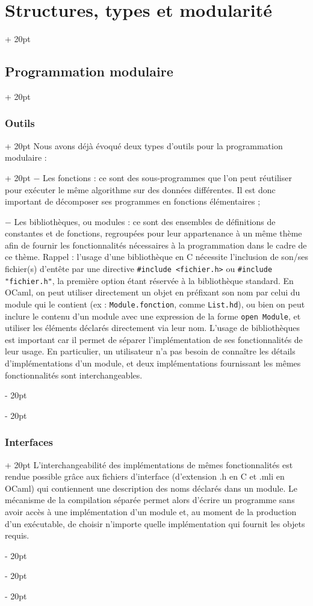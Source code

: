 \documentclass[a4paper, 12pt, twoside]{article}
\newcommand{\ind}[1][20pt]{\advance\leftskip + #1}
\newcommand{\deind}[1][20pt]{\advance\leftskip - #1}
\newenvironment{indt}[2][20pt]{#2 \par \ind[#1]}{\par \deind} %
\begin{document}
\begin{indt}{\section{Structures, types et modularité}}
\begin{indt}{\subsection{Programmation modulaire}}
\begin{indt}{\subsubsection{Outils}}
                \begin{indt}{Nous avons déjà évoqué deux types d’outils pour la programmation modulaire :}
                    $-$ Les fonctions : ce sont des sous-programmes que l’on peut réutiliser pour exécuter le même algorithme sur des données différentes. Il est donc important de décomposer ses programmes en fonctions élémentaires ;
                    
                    $-$ Les bibliothèques, ou modules : ce sont des ensembles de définitions de constantes et de fonctions, regroupées pour leur appartenance à un même thème afin de fournir les fonctionnalités nécessaires à la programmation dans le cadre de ce thème.
                    Rappel : l’usage d’une bibliothèque en C nécessite l’inclusion de son/ses fichier(s) d’entête par une directive \texttt{\#include <fichier.h>} ou \texttt{\#include "fichier.h"}, la première option étant réservée à la bibliothèque standard. En OCaml, on peut utiliser directement un objet en préfixant son nom par celui du module qui le contient (ex : \texttt{Module.fonction}, comme \texttt{List.hd}), ou bien on peut inclure le contenu d’un module avec une expression de la forme \texttt{open Module}, et utiliser les éléments déclarés directement via leur nom. L’usage de bibliothèques est important car il permet de séparer l’implémentation de ses fonctionnalités de leur usage. En particulier, un utilisateur n’a pas besoin de connaître les détails d’implémentations d’un module, et deux implémentations fournissant les mêmes fonctionnalités sont interchangeables.
                \end{indt}
                
            \end{indt}
            
            \begin{indt}{\subsubsection{Interfaces}}
                L’interchangeabilité des implémentations de mêmes fonctionnalités est rendue possible grâce aux fichiers d’interface (d’extension .h en C et .mli en OCaml) qui contiennent une description des noms déclarés dans un module. Le mécanisme de la compilation séparée permet alors d’écrire un programme sans avoir accès à une implémentation d’un module et, au moment de la production d’un exécutable, de choisir n’importe quelle implémentation qui fournit les objets requis.
                

\end{indt}
\end{indt}
\end{indt}
\end{document}
